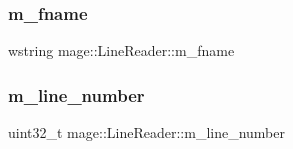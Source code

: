 \subsubsection{\texorpdfstring{m\+\_\+fname}{m\_fname}}
{\footnotesize\ttfamily wstring mage\+::\+Line\+Reader\+::m\+\_\+fname\hspace{0.3cm}{\ttfamily [private]}}

\hypertarget{classmage_1_1_line_reader_ada0b4ec5817b96c6b1bb43bd2573f8ba}{}\label{classmage_1_1_line_reader_ada0b4ec5817b96c6b1bb43bd2573f8ba} 
\subsubsection{\texorpdfstring{m\+\_\+line\+\_\+number}{m\_line\_number}}
{\footnotesize\ttfamily uint32\+\_\+t mage\+::\+Line\+Reader\+::m\+\_\+line\+\_\+number\hspace{0.3cm}{\ttfamily [private]}}

